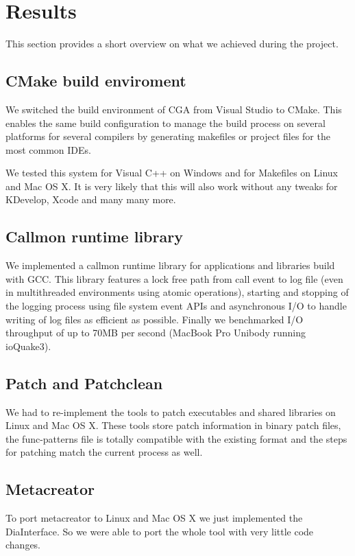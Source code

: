 
\section{Results}

This section provides a short overview on what we achieved during the project.

\subsection{CMake build enviroment} We switched the build environment of CGA from Visual Studio to CMake. This enables the same build configuration to manage the build process on several platforms for several compilers by generating makefiles or project files  for the most common IDEs.

We tested this system for Visual C++ on Windows and for Makefiles on Linux and Mac OS X. It is very likely that this will also work without any tweaks for KDevelop, Xcode and many many more.

\subsection{Callmon runtime library} We implemented a callmon runtime library for applications and libraries build with GCC. This library features a lock free path from call event to log file (even in multithreaded environments using atomic operations), starting and stopping of the logging process using file system event APIs and asynchronous I/O to handle writing of log files as efficient as possible. Finally we benchmarked I/O throughput of up to 70MB per second (MacBook Pro Unibody running ioQuake3).

\subsection{Patch and Patchclean}

We had to re-implement the tools to patch executables and shared libraries on Linux and Mac OS X.  These tools store patch information in binary patch files, the func-patterns file is totally compatible with the existing format and the steps for patching match the current process as well.

\subsection{Metacreator} To port metacreator to Linux and Mac OS X we just implemented the DiaInterface. So we were able to port the whole tool with very little code changes.

